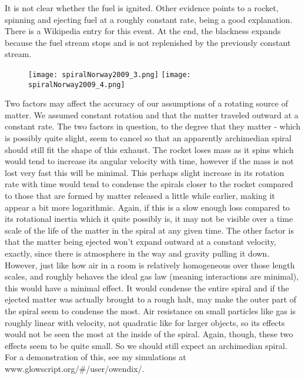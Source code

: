 \documentclass[10pt]{article}
\begin{document}
It is not clear whether the fuel is ignited. 
Other evidence points to a rocket, spinning and ejecting fuel 
at a roughly constant rate, being a good explanation. There is a 
Wikipedia entry for this event. At the end, the blackness 
expands because the fuel stream stops and is not replenished 
by the previously constant stream.

\begin{figure}[H]
\begin{center}
    \texttt{[image: spiralNorway2009\_3.png]}
    \texttt{[image: spiralNorway2009\_4.png]}
\end{center}
\end{figure}

Two factors may affect the accuracy of our assumptions of a rotating 
source of matter. We assumed constant rotation and that the matter 
traveled outward at a constant rate. The two factors in question, 
to the degree that they matter - which is possibly quite slight, seem to 
cancel so that an apparently archimedian spiral should still 
fit the shape of this exhaust. The rocket loses mass as it spins 
which would tend to increase its angular velocity with time, however 
if the mass is not lost very fast this will be minimal. This perhaps slight 
increase in its rotation rate with time would tend to condense the spirals 
closer to the rocket compared to those that are formed by matter released 
a little while earlier, making it appear a bit more logarithmic. Again, 
if this is a slow enough loss compared to its rotational inertia which it 
quite possibly is, it 
may not be visible over a time scale of the life of the matter in the spiral 
at any given time. The other factor is that the matter being ejected won't expand outward at a constant velocity, exactly, since there is atmosphere in the 
way and gravity pulling it down. However, just like how air in a room is 
relatively homogeneous over those length scales, and roughly behaves the 
ideal gas law (meaning interactions are minimal), this would have a minimal 
effect. It would condense the entire spiral and if the ejected matter was 
actually brought to a rough halt, may make the outer part of the spiral seem to 
condense the most. Air resistance on small particles like gas is roughly 
linear with velocity, not quadratic like for larger objects, 
so its effects would not be seen the most at the inside of the spiral. Again, 
though, these two effects seem to be quite small. So we should still expect an 
archimedian spiral. For a demonstration of this, see my simulations at 
www.glowscript.org/\#/user/owendix/.
\end{document}
